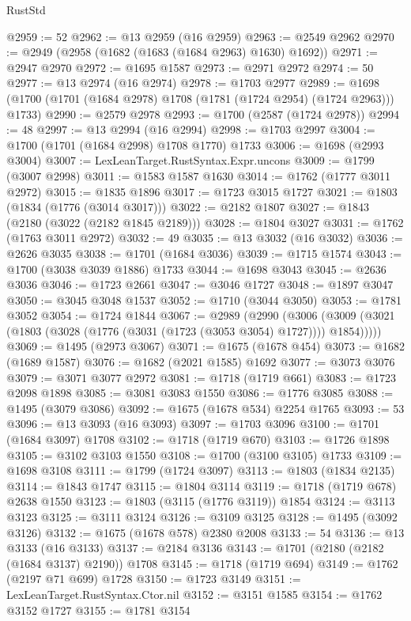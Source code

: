 \begin{lexlean}{RustStd}
\begin{coremodule}
@2959 := 52
@2962 := @13 @2959 (@16 @2959)
@2963 := @2549 @2962
@2970 := @2949 (@2958 (@1682 (@1683 (@1684 @2963) @1630) @1692))
@2971 := @2947 @2970
@2972 := @1695 @1587
@2973 := @2971 @2972
@2974 := 50
@2977 := @13 @2974 (@16 @2974)
@2978 := @1703 @2977
@2989 := @1698 (@1700 (@1701 (@1684 @2978) @1708 (@1781 (@1724 @2954) (@1724 @2963))) @1733)
@2990 := @2579 @2978
@2993 := @1700 (@2587 (@1724 @2978))
@2994 := 48
@2997 := @13 @2994 (@16 @2994)
@2998 := @1703 @2997
@3004 := @1700 (@1701 (@1684 @2998) @1708 @1770) @1733
@3006 := @1698 (@2993 @3004)
@3007 := LexLeanTarget.RustSyntax.Expr.uncons
@3009 := @1799 (@3007 @2998)
@3011 := @1583 @1587 @1630
@3014 := @1762 (@1777 @3011 @2972)
@3015 := @1835 @1896
@3017 := @1723 @3015 @1727
@3021 := @1803 (@1834 (@1776 (@3014 @3017)))
@3022 := @2182 @1807
@3027 := @1843 (@2180 (@3022 (@2182 @1845 @2189)))
@3028 := @1804 @3027
@3031 := @1762 (@1763 @3011 @2972)
@3032 := 49
@3035 := @13 @3032 (@16 @3032)
@3036 := @2626 @3035
@3038 := @1701 (@1684 @3036)
@3039 := @1715 @1574
@3043 := @1700 (@3038 @3039 @1886) @1733
@3044 := @1698 @3043
@3045 := @2636 @3036
@3046 := @1723 @2661
@3047 := @3046 @1727
@3048 := @1897 @3047
@3050 := @3045 @3048 @1537
@3052 := @1710 (@3044 @3050)
@3053 := @1781 @3052
@3054 := @1724 @1844
@3067 := @2989
    (@2990
      (@3006 (@3009 (@3021 (@1803 (@3028 (@1776 (@3031 (@1723 (@3053 @3054) @1727)))) @1854)))))
@3069 := @1495 (@2973 @3067)
@3071 := @1675 (@1678 @454)
@3073 := @1682 (@1689 @1587)
@3076 := @1682 (@2021 @1585) @1692
@3077 := @3073 @3076
@3079 := @3071 @3077 @2972
@3081 := @1718 (@1719 @661)
@3083 := @1723 @2098 @1898
@3085 := @3081 @3083 @1550
@3086 := @1776 @3085
@3088 := @1495 (@3079 @3086)
@3092 := @1675 (@1678 @534) @2254 @1765
@3093 := 53
@3096 := @13 @3093 (@16 @3093)
@3097 := @1703 @3096
@3100 := @1701 (@1684 @3097) @1708
@3102 := @1718 (@1719 @670)
@3103 := @1726 @1898
@3105 := @3102 @3103 @1550
@3108 := @1700 (@3100 @3105) @1733
@3109 := @1698 @3108
@3111 := @1799 (@1724 @3097)
@3113 := @1803 (@1834 @2135)
@3114 := @1843 @1747
@3115 := @1804 @3114
@3119 := @1718 (@1719 @678) @2638 @1550
@3123 := @1803 (@3115 (@1776 @3119)) @1854
@3124 := @3113 @3123
@3125 := @3111 @3124
@3126 := @3109 @3125
@3128 := @1495 (@3092 @3126)
@3132 := @1675 (@1678 @578) @2380 @2008
@3133 := 54
@3136 := @13 @3133 (@16 @3133)
@3137 := @2184 @3136
@3143 := @1701 (@2180 (@2182 (@1684 @3137) @2190)) @1708
@3145 := @1718 (@1719 @694)
@3149 := @1762 (@2197 @71 @699) @1728
@3150 := @1723 @3149
@3151 := LexLeanTarget.RustSyntax.Ctor.nil
@3152 := @3151 @1585
@3154 := @1762 @3152 @1727
@3155 := @1781 @3154

\end{coremodule}
\end{lexlean}
